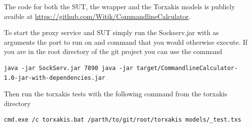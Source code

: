 \documentclass[11pt,a4paper]{article}
\begin{document}
The code for both the SUT, the wrapper and the Torxakis models is
publicly avaible at
\url{https://github.com/Witik/CommandlineCalculator}.

To start the proxy service and SUT simply run the Sockserv.jar with as
arguments the port to run on and command that you would otherwise
execute. If you are in the root directory of the git project you can use the command

\begin{verbatim}
java -jar SockServ.jar 7890 java -jar target/CommandlineCalculator-1.0-jar-with-dependencies.jar
\end{verbatim}

Then run the torxakis tests with the following command from the torxakis directory

\begin{verbatim}
cmd.exe /c torxakis.bat /parth/to/git/root/torxakis models/_test.txs
\end{verbatim}
\end{document}
